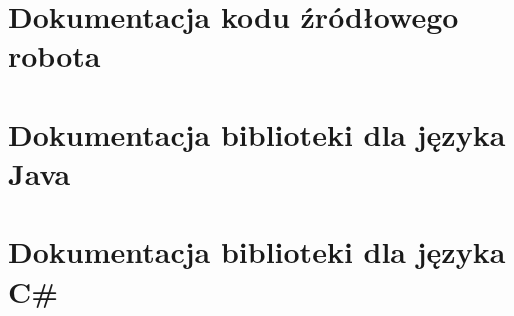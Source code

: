 \label{ch:source-code}

\section{Dokumentacja kodu źródłowego robota}
\section{Dokumentacja biblioteki dla języka Java}
\section{Dokumentacja biblioteki dla języka C\#}
 


 